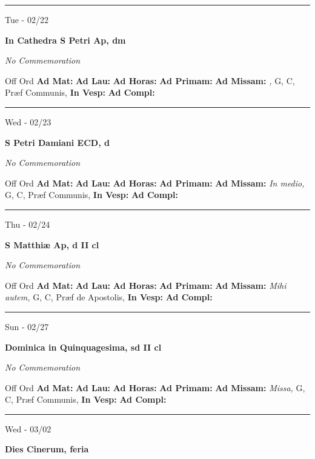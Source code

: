 \documentclass[letterpaper, 10pt]{article}
\begin{document}
\hrule
\begin{center}
Tue - 02/22
\end{center}\textbf{ \large In Cathedra S Petri Ap, \textnormal{\normalsize dm}}

\textit{No Commemoration}\begin{justify}
Off Ord
\textbf{Ad Mat: }
\textbf{Ad Lau: }
\textbf{Ad Horas: }
\textbf{Ad Primam: }
\textbf{Ad Missam:} \textit{, } G, C, Præf Communis, 
\textbf{In Vesp: }
\textbf{Ad Compl: }\end{justify}



\hrule
\begin{center}
Wed - 02/23
\end{center}\textbf{ \large S Petri Damiani ECD, \textnormal{\normalsize d}}

\textit{No Commemoration}\begin{justify}
Off Ord
\textbf{Ad Mat: }
\textbf{Ad Lau: }
\textbf{Ad Horas: }
\textbf{Ad Primam: }
\textbf{Ad Missam:} \textit{In medio, } G, C, Præf Communis, 
\textbf{In Vesp: }
\textbf{Ad Compl: }\end{justify}



\hrule
\begin{center}
Thu - 02/24
\end{center}\textbf{ \large S Matthiæ Ap, \textnormal{\normalsize d II cl}}

\textit{No Commemoration}\begin{justify}
Off Ord
\textbf{Ad Mat: }
\textbf{Ad Lau: }
\textbf{Ad Horas: }
\textbf{Ad Primam: }
\textbf{Ad Missam:} \textit{Mihi autem, } G, C, Præf de Apostolis, 
\textbf{In Vesp: }
\textbf{Ad Compl: }\end{justify}



\hrule
\begin{center}
Sun - 02/27
\end{center}\textbf{ \large Dominica in Quinquagesima, \textnormal{\normalsize sd II cl}}

\textit{No Commemoration}\begin{justify}
Off Ord
\textbf{Ad Mat: }
\textbf{Ad Lau: }
\textbf{Ad Horas: }
\textbf{Ad Primam: }
\textbf{Ad Missam:} \textit{Missa, } G, C, Præf Communis, 
\textbf{In Vesp: }
\textbf{Ad Compl: }\end{justify}



\hrule
\begin{center}
Wed - 03/02
\end{center}\textbf{ \large Dies Cinerum, \textnormal{\normalsize feria}}
\end{document}
